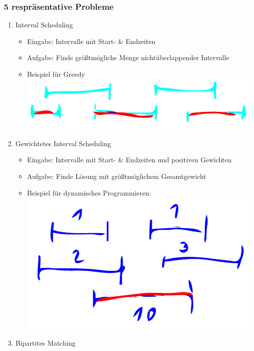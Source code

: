 \documentclass{scrartcl}
\begin{document}
\subsubsection{5 respräsentative Probleme}
\begin{enumerate}
	\item Interval Scheduling
	\begin{itemize}
		\item Eingabe: Intervalle mit Start- \& Endzeiten
		\item Aufgabe: Finde größtmögliche Menge nichtüberlappender Intervalle
		\item Beispiel für Greedy \\
		\includegraphics[width=\linewidth]{figures/interval-scheduling.pdf}
	\end{itemize}
	\item Gewichtetes Interval Scheduling
	\begin{itemize}
		\item Eingabe: Intervalle mit Start- \& Endzeiten und positiven Gewichten
		\item Aufgabe: Finde Lösung mit größtmöglichem Gesamtgewicht
		\item Beispiel für dynamisches Programmieren: \\
		\includegraphics[width=\linewidth]{figures/gewichtetes-interval-scheduling.pdf}
	\end{itemize}
	\item Bipartites Matching

\end{enumerate}
\end{document}
